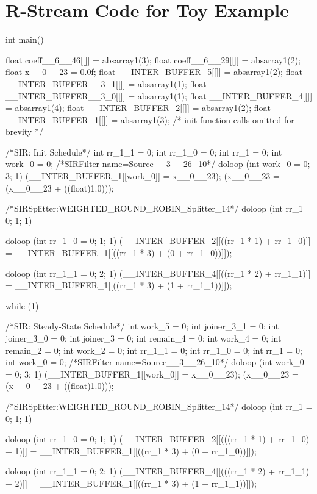 \documentclass[10pt, letterpaper, onecolumn]{article}
\begin{document}
\section{R-Stream Code for Toy Example}
\label{ccode}
\scriptsize
\begin{verbatimtab}[4]
int main() {
  float coeff__6__46[[]] =  absarray1(3);
  float coeff__6__29[[]] =  absarray1(2);
  float x__0__23 = 0.0f;
  float __INTER_BUFFER_5[[]] =  absarray1(2);
  float __INTER_BUFFER__3_1[[]] =  absarray1(1);
  float __INTER_BUFFER__3_0[[]] =  absarray1(1);
  float __INTER_BUFFER_4[[]] =  absarray1(4);
  float __INTER_BUFFER_2[[]] =  absarray1(2);
  float __INTER_BUFFER_1[[]] =  absarray1(3);
  { 
/* init function calls omitted for brevity */
  }
  { 
/*SIR: Init Schedule*/
    int rr_1_1 = 0;
    int rr_1_0 = 0;
    int rr_1 = 0;
    int work_0 = 0;
/*SIRFilter name=Source__3__26_10*/
    doloop (int work_0 = 0; 3; 1) 
      {
        (__INTER_BUFFER_1[[work_0]] = x__0__23);
        (x__0__23 = (x__0__23 + ((float)1.0)));
      }
    
/*SIRSplitter:WEIGHTED_ROUND_ROBIN_Splitter_14*/
    doloop (int rr_1 = 0; 1; 1) 
      {
        doloop (int rr_1_0 = 0; 1; 1) 
          (__INTER_BUFFER_2[[((rr_1 * 1) + rr_1_0)]] = 
	   __INTER_BUFFER_1[[((rr_1 * 3) + (0 + rr_1_0))]]);

        doloop (int rr_1_1 = 0; 2; 1) 
          (__INTER_BUFFER_4[[((rr_1 * 2) + rr_1_1)]] = 
	   __INTER_BUFFER_1[[((rr_1 * 3) + (1 + rr_1_1))]]);

      }

  }

  while (1) {
/*SIR: Steady-State Schedule*/
    int work_5 = 0;
    int joiner_3_1 = 0;
    int joiner_3_0 = 0;
    int joiner_3 = 0;
    int remain_4 = 0;
    int work_4 = 0;
    int remain_2 = 0;
    int work_2 = 0;
    int rr_1_1 = 0;
    int rr_1_0 = 0;
    int rr_1 = 0;
    int work_0 = 0;
/*SIRFilter name=Source__3__26_10*/
    doloop (int work_0 = 0; 3; 1) 
      {
        (__INTER_BUFFER_1[[work_0]] = x__0__23);
        (x__0__23 = (x__0__23 + ((float)1.0)));
      }
    
/*SIRSplitter:WEIGHTED_ROUND_ROBIN_Splitter_14*/
    doloop (int rr_1 = 0; 1; 1) 
      {
        doloop (int rr_1_0 = 0; 1; 1) 
          (__INTER_BUFFER_2[[(((rr_1 * 1) + rr_1_0) + 1)]] = 
	   __INTER_BUFFER_1[[((rr_1 * 3) + (0 + rr_1_0))]]);

        doloop (int rr_1_1 = 0; 2; 1) 
          (__INTER_BUFFER_4[[(((rr_1 * 2) + rr_1_1) + 2)]] = 
	   __INTER_BUFFER_1[[((rr_1 * 3) + (1 + rr_1_1))]]);

}}}
\end{verbatimtab}
\end{document}
